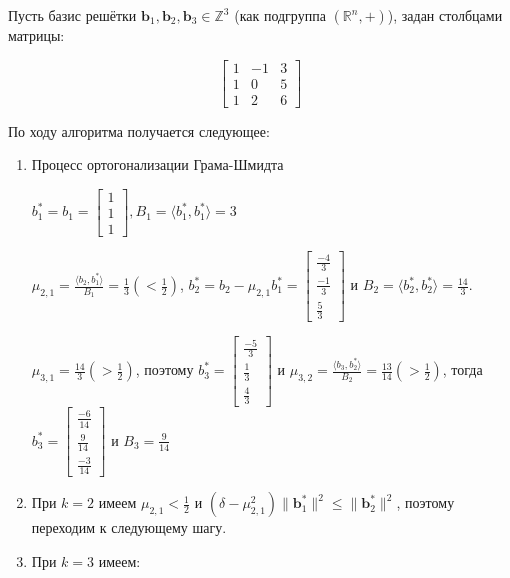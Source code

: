 \documentclass[12pt,a4paper]{scrartcl}
\begin{document}
Пусть базис решётки $\mathbf {b} _{1},\mathbf {b} _{2},\mathbf {b} _{3}\in \mathbb {Z} ^{3}$ (как подгруппа $(\mathbb {R} ^{n},+)$), задан столбцами матрицы:

$${\begin{bmatrix}1&-1&3\\1&0&5\\1&2&6\end{bmatrix}}$$

По ходу алгоритма получается следующее:

\begin{enumerate}
	\item Процесс ортогонализации Грама-Шмидта
	
	\subitem $b_{1}^{*}=b_{1}={\begin{bmatrix}1\\1\\1\end{bmatrix}},B_{1}=\langle b_{1}^{*},b_{1}^{*}\rangle =3$
	
	\subitem $\mu _{2,1}={\frac {\langle b_{2},b_{1}^{*}\rangle }{B_{1}}}={\frac {1}{3}}\left(<{\frac {1}{2}}\right)$, $b_{2}^{*}=b_{2}-\mu _{2,1}b_{1}^{*}={\begin{bmatrix}{\frac {-4}{3}}\\{\frac {-1}{3}}\\{\frac {5}{3}}\end{bmatrix}}$ и $B_{2}=\langle b_{2}^{*},b_{2}^{*}\rangle ={\frac {14}{3}}.$
	
	\subitem $\mu _{3,1}={\frac {14}{3}}(>{\frac {1}{2}})$, поэтому $b_{3}^{*}={\begin{bmatrix}{\frac {-5}{3}}\\{\frac {1}{3}}\\{\frac {4}{3}}\end{bmatrix}}$ и $\mu _{3,2}={\frac {\langle b_{3},b_{2}^{*}\rangle }{B_{2}}}={\frac {13}{14}}\left(>{\frac {1}{2}}\right)$, тогда $b_{3}^{*}={\begin{bmatrix}{\frac {-6}{14}}\\{\frac {9}{14}}\\{\frac {-3}{14}}\end{bmatrix}}$ и $B_{3}={\frac {9}{14}}$
	
	\item При $k=2$ имеем $\mu _{2,1}<{\frac {1}{2}}$ и $(\delta -\mu _{2,1}^{2})\|\mathbf {b} _{1}^{*}\|^{2}\leqslant \|\mathbf {b} _{2}^{*}\|^{2}$, поэтому переходим к следующему шагу.
	
	\item При $k=3$ имеем:
	

\end{enumerate}
\end{document}
